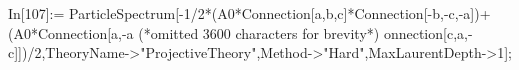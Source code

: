 In[107]:= ParticleSpectrum[-1/2*(A0*Connection[a,b,c]*Connection[-b,-c,-a])+(A0*Connection[a,-a (*omitted 3600 characters for brevity*) onnection[c,a,-c]])/2,TheoryName->"ProjectiveTheory",Method->"Hard",MaxLaurentDepth->1];